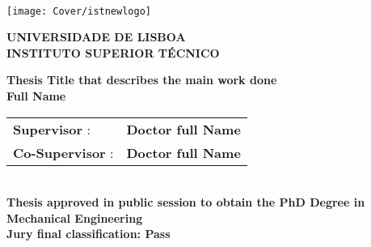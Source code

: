 \setcounter{page}{1} 


\thispagestyle{empty}
\begin{flushleft} ~\\ \vspace{-12mm} \hspace{-12mm}  \texttt{[image: Cover/istnewlogo]} 
 
\centering
\LARGE \textbf{UNIVERSIDADE DE LISBOA \\ INSTITUTO SUPERIOR TÉCNICO}
\vspace{10mm}

 
\centering
\Large \textbf{Thesis Title that describes the main work done}
\\ \vspace{8mm}  %
\Large\textbf{Full Name} \\
\vspace{8mm}

\Large %
\begin{minipage}{\textwidth}
\begin{tabularx}{\textwidth}{ l @{ } l }
 \textbf{Supervisor} : & \textbf{Doctor full Name}\\
 \textbf{Co-Supervisor} :  &  \textbf{Doctor full Name}\\
\end{tabularx}
\end{minipage}
\\ \vspace{8mm}
\centering
\Large \textbf{Thesis approved in public session to obtain the PhD Degree in}\\
\Large \textbf{Mechanical Engineering}\\
\vspace{5mm}
\Large \textbf{Jury final classification:  Pass}\\
 

\end{flushleft}
